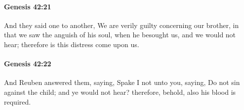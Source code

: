 		\paragraph{Genesis 42:21} %
			\label{GENESIS-42-21}

			And they said one to another, We are verily guilty concerning our brother, in that we saw the anguish of his soul, when he besought us, and we would not hear; therefore is this distress come upon us.


		\paragraph{Genesis 42:22} %
			\label{GENESIS-42-22}

			And Reuben answered them, saying, Spake I not unto you, saying, Do not sin against the child; and ye would not hear? therefore, behold, also his blood is required.



